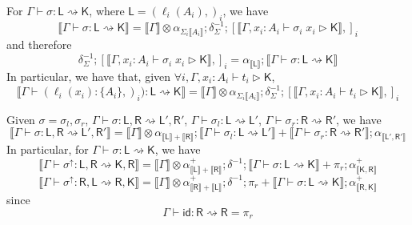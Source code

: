 \documentclass[acmsmall,screen,review]{acmart}
\newcounter{todos}
\newcommand{\todo}[1]{\stepcounter{todos} \textcolor{red}{\textbf{TODO \arabic{todos}}: #1}}
\newcommand{\ms}[1]{\ensuremath{\mathsf{#1}}}
\newcommand{\lto}{:}
\newcommand{\wbranch}[3]{#1(#2) \lto \{#3\}}
\newcommand{\upg}[1]{{#1}^\uparrow}
\newcommand{\bhyp}[2]{#1 : #2}
\newcommand{\haslb}[3]{#1 \vdash #2 \rhd #3}
\newcommand{\lbsubst}[4]{#1 \vdash #2: #3 \rightsquigarrow #4}
\newcommand{\dnt}[1]{\llbracket{#1}\rrbracket}
\begin{document}
\begin{lemma}
  For $\lbsubst{\Gamma}{\sigma}{\ms{L}}{\ms{K}}$, where $\ms{L} = (\ell_i(A_i),)_i$, we have
  \begin{equation}
    \dnt{\lbsubst{\Gamma}{\sigma}{\ms{L}}{\ms{K}}} 
    = \dnt{\Gamma} \otimes \alpha_{\Sigma_i\dnt{A_i}} 
    ; \delta^{-1}_{\Sigma}
    ; [\dnt{\haslb{\Gamma, \bhyp{x_i}{A_i}}{\sigma_i\;x_i}{\ms{K}}},]_i
  \end{equation}
  and therefore
  \begin{equation}
    \delta^{-1}_{\Sigma}
    ; [\dnt{\haslb{\Gamma, \bhyp{x_i}{A_i}}{\sigma_i\;x_i}{\ms{K}}},]_i
    = \alpha_{\dnt{\ms{L}}}
    ; \dnt{\lbsubst{\Gamma}{\sigma}{\ms{L}}{\ms{K}}} 
  \end{equation}
  In particular, we have that, given $\forall i, \haslb{\Gamma, \bhyp{x_i}{A_i}}{t_i}{\ms{K}}$,
  \begin{equation}
    \dnt{\lbsubst{\Gamma}{(\wbranch{\ell_i}{x_i}{A_i},)_i)}{\ms{L}}{\ms{K}}}
    = \dnt{\Gamma} \otimes \alpha_{\Sigma_i\dnt{A_i}} 
    ; \delta^{-1}_{\Sigma}
    ; [\dnt{\haslb{\Gamma, \bhyp{x_i}{A_i}}{t_i}{\ms{K}}},]_i
  \end{equation}
  \label{lem:lsubst-distrib}
\end{lemma}


\begin{lemma}
  Given $\sigma = \sigma_l, \sigma_r$,
    $\lbsubst{\Gamma}{\sigma}{\ms{L}, \ms{R}}{\ms{L}', \ms{R}'}$,
    $\lbsubst{\Gamma}{\sigma_l}{\ms{L}}{\ms{L}'}$,
    $\lbsubst{\Gamma}{\sigma_r}{\ms{R}}{\ms{R}'}$, we have
  \begin{equation}
    \dnt{\lbsubst{\Gamma}{\sigma}{\ms{L}, \ms{R}}{\ms{L}', \ms{R}'}}
    = \dnt{\Gamma} \otimes \alpha_{\dnt{\ms{L}} + \dnt{\ms{R}}} 
    ; \dnt{\lbsubst{\Gamma}{\sigma_l}{\ms{L}}{\ms{L}'}} 
    + \dnt{\lbsubst{\Gamma}{\sigma_r}{\ms{R}}{\ms{R}'}}
    ; \alpha_{\dnt{\ms{L}', \ms{R}'}}
  \end{equation}
  In particular, for $\lbsubst{\Gamma}{\sigma}{\ms{L}}{\ms{K}}$, we have
  \begin{equation}
    \dnt{\lbsubst{\Gamma}{\upg{\sigma}}{\ms{L}, \ms{R}}{\ms{K}, \ms{R}}}
    = \dnt{\Gamma} \otimes \alpha^+_{\dnt{\ms{L}} + \dnt{\ms{R}}} 
      ; \delta^{-1} 
      ; \dnt{\lbsubst{\Gamma}{\sigma}{\ms{L}}{\ms{K}}} + \pi_r
      ; \alpha^+_{\dnt{\ms{K}, \ms{R}}}
  \end{equation}
  \begin{equation}
    \dnt{\lbsubst{\Gamma}{\upg{\sigma}}{\ms{R}, \ms{L}}{\ms{R}, \ms{K}}}
    = \dnt{\Gamma} \otimes \alpha^+_{\dnt{\ms{R}} + \dnt{\ms{L}}} 
      ; \delta^{-1} 
      ; \pi_r + \dnt{\lbsubst{\Gamma}{\sigma}{\ms{L}}{\ms{K}}}
      ; \alpha^+_{\dnt{\ms{R}, \ms{K}}}
  \end{equation}
  since
  \begin{equation}
    \lbsubst{\Gamma}{\ms{id}}{\ms{R}}{\ms{R}} = \pi_r
  \end{equation}
\end{lemma}
\end{document}
